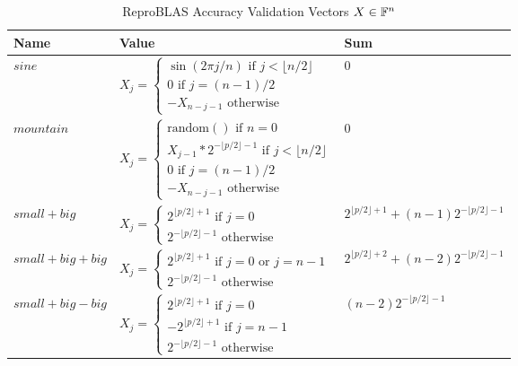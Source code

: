     \begin{table}[!htbp]
        \centering
        \begin{tabular}{ | l |  l | l |} \hline
            Name & Value & Sum\\ \hline
            $sine$ & $X_j = \begin{cases}\sin(2 \pi j/n) \text{ if } j < \lfloor n/2 \rfloor\\ 0 \text{ if } j = (n - 1)/2 \\ -X_{n - j - 1} \text{ otherwise } \end{cases}$ & 0\\ \hline
            $mountain$ & $X_j = \begin{cases}\text{random}()\text{ if } n = 0 \\ X_{j - 1} * 2^{-\lfloor p/2\rfloor - 1} \text{ if } j < \lfloor n/2 \rfloor\\ 0 \text{ if } j = (n - 1)/2 \\ -X_{n - j - 1} \text{ otherwise } \end{cases}$ & 0 \\\hline
            $small + big$ & $X_j = \begin{cases} 2^{\lfloor p/2\rfloor + 1} \text{ if } j = 0 \\ 2^{-\lfloor p/2\rfloor - 1} \text{ otherwise} \end{cases}$ & $2^{\lfloor p/2\rfloor + 1} + (n - 1) 2^{-\lfloor p/2\rfloor - 1}$ \\\hline
            $small + big + big$ & $X_j = \begin{cases} 2^{\lfloor p/2\rfloor + 1} \text{ if } j = 0 \text{ or } j = n - 1 \\ 2^{-\lfloor p/2\rfloor - 1} \text{ otherwise} \end{cases}$ & $2^{\lfloor p/2\rfloor + 2} + (n - 2) 2^{-\lfloor p/2\rfloor - 1}$\\ \hline
            $small + big - big$ & $X_j = \begin{cases} 2^{\lfloor p/2\rfloor + 1} \text{ if } j = 0\\-2^{\lfloor p/2\rfloor + 1} \text{ if } j = n - 1\\ 2^{-\lfloor p/2\rfloor - 1} \text{ otherwise} \end{cases}$ & $(n - 2) 2^{-\lfloor p/2\rfloor - 1}$\\ \hline
        \end{tabular}
        \caption{ReproBLAS Accuracy Validation Vectors $X \in \mathbb{F}^n$}
        \label{tbl:validateblas1data}
    \end{table}

